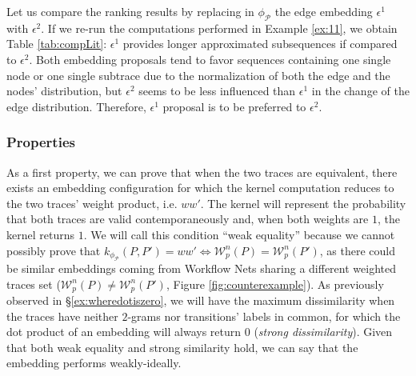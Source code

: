 \begin{example}\label{ex:cmpexample}
	Let us compare the ranking results by replacing in $\phi_{\mathcal{P}}$ the edge embedding $\epsilon^1$ with $\epsilon^2$. If we re-run the computations performed in  Example \ref{ex:11}, we obtain   Table \ref{tab:compLit}:  $\epsilon^1$ provides longer approximated subsequences if compared to $\epsilon^2$. Both embedding proposals tend to favor sequences containing one single node or one single subtrace due to the normalization of both  the edge and the nodes' distribution, but $\epsilon^2$ seems to be less influenced than $\epsilon^1$ in the change of the edge distribution. Therefore, $\epsilon^1$ proposal is to be preferred to $\epsilon^2$.
\end{example}


\subsubsection{Properties}\label{subsub:prop}
As a first property, we can prove that when the two traces are equivalent,  there exists an embedding configuration for which the kernel computation reduces to the two traces' weight product, i.e. $ww'$. The kernel will represent the probability that both traces are valid contemporaneously and, when both weights are $1$, the kernel returns $1$. We will call this condition  ``weak equality'' because we cannot possibly prove that $k_{\phi_{\mathcal{P}}}(P,P')=ww'\Leftrightarrow \mathcal{W}_p^n(P)=\mathcal{W}_p^n(P')$, as there could be similar embeddings coming from Workflow Nets sharing a different weighted traces set ($\mathcal{W}_p^n(P)\neq\mathcal{W}_p^n(P')$, Figure \ref{fig:counterexample}). As previously observed in \S\ref{ex:wheredotiszero}, we will have the maximum dissimilarity when the traces have neither $2$-grams nor transitions' labels in common, for which the dot product of an embedding will always return $0$ (\textit{strong dissimilarity}). Given that both weak equality and strong similarity hold, we can say that the embedding performs weakly-ideally.

